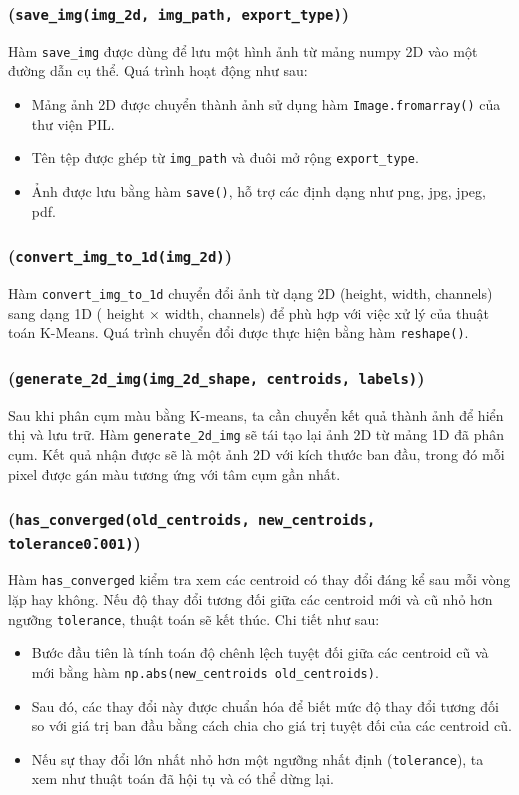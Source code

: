 \subsubsection{(\texttt{save\_img(img\_2d, img\_path, export\_type)})}
Hàm \texttt{save\_img} được dùng để lưu một hình ảnh từ mảng numpy 2D vào một đường dẫn cụ thể. Quá trình hoạt động như sau:
\begin{itemize}
	\item Mảng ảnh 2D được chuyển thành ảnh sử dụng hàm \texttt{Image.fromarray()} của thư viện PIL.
	\item Tên tệp được ghép từ \texttt{img\_path} và đuôi mở rộng \texttt{export\_type}.
	\item Ảnh được lưu bằng hàm \texttt{save()}, hỗ trợ các định dạng như png, jpg, jpeg, pdf.
\end{itemize}

\subsubsection{(\texttt{convert\_img\_to\_1d(img\_2d)})}

Hàm \texttt{convert\_img\_to\_1d} chuyển đổi ảnh từ dạng 2D (height, width, channels) sang dạng 1D ( height $\times$ width, channels) để phù hợp với việc xử lý của thuật toán K-Means. Quá trình chuyển đổi được thực hiện bằng hàm \texttt{reshape()}.

\subsubsection{(\texttt{generate\_2d\_img(img\_2d\_shape, centroids, labels)})}

Sau khi phân cụm màu bằng K-means, ta cần chuyển kết quả thành ảnh để hiển thị và lưu trữ. Hàm \texttt{generate\_2d\_img} sẽ tái tạo lại ảnh 2D từ mảng 1D đã phân cụm. Kết quả nhận được sẽ là một ảnh 2D với kích thước ban đầu, trong đó mỗi pixel được gán màu tương ứng với tâm cụm gần nhất.

\subsubsection{(\texttt{has\_converged(old\_centroids, new\_centroids, tolerance\=0.001)})}

Hàm \texttt{has\_converged} kiểm tra xem các centroid có thay đổi đáng kể sau mỗi vòng lặp hay không. Nếu độ thay đổi tương đối giữa các centroid mới và cũ nhỏ hơn ngưỡng \texttt{tolerance}, thuật toán sẽ kết thúc. Chi tiết như sau:
\begin{itemize}
	\item Bước đầu tiên là tính toán độ chênh lệch tuyệt đối giữa các centroid cũ và mới bằng hàm \texttt{np.abs(new\_centroids \- old\_centroids)}.
	\item Sau đó, các thay đổi này được chuẩn hóa để biết mức độ thay đổi tương đối so với giá trị ban đầu bằng cách chia cho giá trị tuyệt đối của các centroid cũ.
	\item Nếu sự thay đổi lớn nhất nhỏ hơn một ngưỡng nhất định (\texttt{tolerance}), ta xem như thuật toán đã hội tụ và có thể dừng lại.
\end{itemize}

